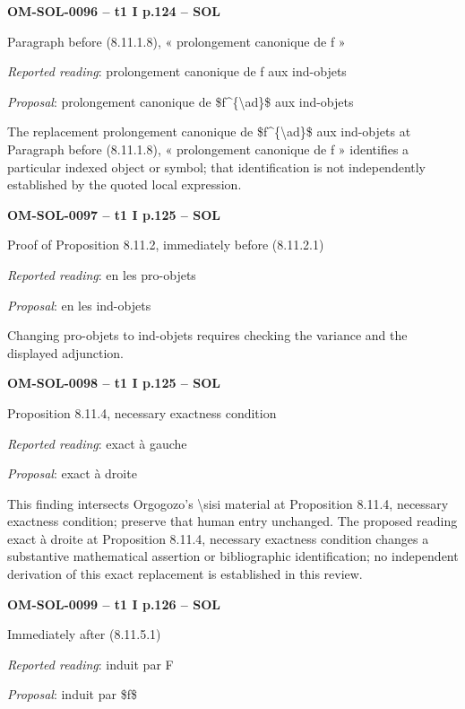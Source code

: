 \par\noindent\textbf{OM-SOL-0096 -- t1 I p.124 -- SOL}\par
Paragraph before (8.11.1.8), « prolongement canonique de f »\par
\emph{Reported reading}: prolongement canonique de f aux ind-objets\par
\emph{Proposal}: prolongement canonique de \$f\textasciicircum{}\{\textbackslash{}ad\}\$ aux ind-objets\par
The replacement prolongement canonique de \$f\textasciicircum{}\{\textbackslash{}ad\}\$ aux ind-objets at Paragraph before (8.11.1.8), « prolongement canonique de f » identifies a particular indexed object or symbol; that identification is not independently established by the quoted local expression.\par
\par\noindent\textbf{OM-SOL-0097 -- t1 I p.125 -- SOL}\par
Proof of Proposition 8.11.2, immediately before (8.11.2.1)\par
\emph{Reported reading}: en les pro-objets\par
\emph{Proposal}: en les ind-objets\par
Changing pro-objets to ind-objets requires checking the variance and the displayed adjunction.\par
\par\noindent\textbf{OM-SOL-0098 -- t1 I p.125 -- SOL}\par
Proposition 8.11.4, necessary exactness condition\par
\emph{Reported reading}: exact à gauche\par
\emph{Proposal}: exact à droite\par
This finding intersects Orgogozo's \textbackslash{}sisi material at Proposition 8.11.4, necessary exactness condition; preserve that human entry unchanged. The proposed reading exact à droite at Proposition 8.11.4, necessary exactness condition changes a substantive mathematical assertion or bibliographic identification; no independent derivation of this exact replacement is established in this review.\par
\par\noindent\textbf{OM-SOL-0099 -- t1 I p.126 -- SOL}\par
Immediately after (8.11.5.1)\par
\emph{Reported reading}: induit par F\par
\emph{Proposal}: induit par \$f\$\par

